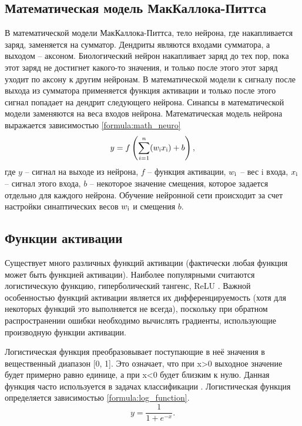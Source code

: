 \subsection{Математическая модель МакКаллока-Питтса}
В математической модели МакКаллока-Питтса, тело нейрона, где накапливается заряд, заменяется на сумматор. Дендриты являются входами сумматора, а выходом -- аксоном. Биологический нейрон накапливает заряд до тех пор, пока этот заряд не достигнет какого-то значения, и только после этого этот заряд уходит по аксону к другим нейронам. В математической модели к сигналу после выхода из сумматора применяется функция активации и только после этого сигнал попадает на дендрит следующего нейрона. Синапсы в математической модели заменяются на веса входов нейрона. Математическая модель нейрона выражается зависимостью \ref{formula:math_neuro}
\begin{equation}\label{formula:math_neuro}
y = f\left(\sum\limits_{i = 1}^{n}(w_{\rm{i}}x_{\rm{i}}) + b\right),
\end{equation}
где $y$ -- сигнал на выходе из нейрона, $f$ -- функция активации, $w_{\rm{i}}$ -- вес i входа, $x_{\rm{i}}$ -- сигнал этого входа, $b$ -- некоторое значение смещения, которое задается отдельно для каждого нейрона. Обучение нейронной сети происходит за счет настройки синаптических весов $w_{\rm{i}}$ и смещения $b$.

\subsection{Функции активации}
Существует много различных функций активации (фактически любая функция может быть функцией активации). Наиболее популярными считаются логистическую функцию, гиперболический тангенс, ReLU \cite{activation_function}. Важной особенностью функций активации является их дифференцируемость (хотя для некоторых функций это выполняется не всегда), поскольку при обратном распространении ошибки необходимо вычислять градиенты, использующие производную функции активации.

Логистическая функция преобразовывает поступающие в неё значения в
вещественный диапазон [0, 1]. Это означает, что при x>0 выходное значение будет примерно равно единице, а при x<0 будет близким к нулю. Данная функция часто используется в задачах классификации \cite{activation_function}. Логистическая функция определяется зависимостью \ref{formula:log_function}.
\begin{equation}\label{formula:log_function}
y = \frac{1}{1 + e^{-x}}.
\end{equation}

